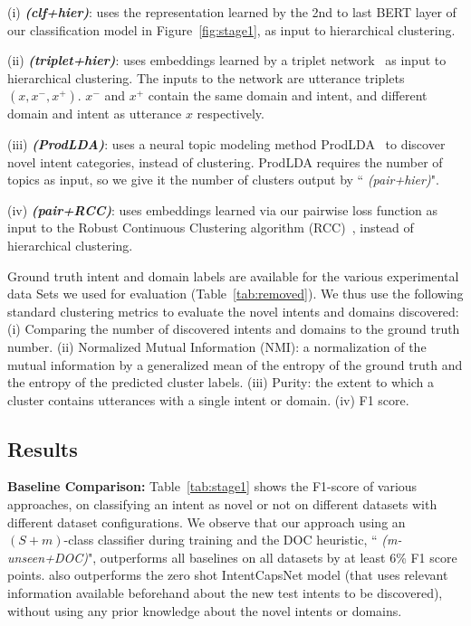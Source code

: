 \smallskip

\noindent (i) \textbf{\mname{} \textit{(clf+hier)}}: uses the representation learned by the 2nd to last BERT layer of our classification model in Figure~\ref{fig:stage1}, as input to hierarchical clustering. 

\noindent (ii) \textbf{\mname{} \textit{(triplet+hier)}}: uses embeddings learned by a triplet network~\cite{schroff2015facenet} as input to hierarchical clustering. The inputs to the network are utterance triplets $(x, x^-, x^+)$. $x^-$ and $x^+$ contain the same domain and intent, and different domain and intent as utterance $x$ respectively. 

\noindent (iii)  \textbf{\mname{} \textit{(ProdLDA)}}: uses a neural topic modeling method ProdLDA~\cite{srivastava2017autoencoding} to discover novel intent categories, instead of clustering. %
ProdLDA requires the number of topics as input, so we give it the number of clusters output by ``\mname{} \textit{(pair+hier)}".

\noindent (iv) \textbf{\mname{} \textit{(pair+RCC)}}: uses embeddings learned via our pairwise loss function as input to the Robust Continuous Clustering algorithm (RCC)~\cite{shah2017robust}, instead of hierarchical clustering. 
\smallskip

Ground truth intent and domain labels are available for the various experimental data Sets we used for evaluation (Table~\ref{tab:removed}). We thus use the following standard clustering metrics to evaluate the novel intents and domains discovered: (i) Comparing the number of discovered intents and domains to the ground truth number. (ii) Normalized Mutual Information (NMI): a normalization of the mutual information by a generalized mean of the entropy of the ground truth and the entropy of the predicted cluster labels. %
(iii) Purity: the extent to which a cluster contains utterances with a single intent or domain. (iv) F1 score.

\subsection{Results}

\noindent \textbf{Baseline Comparison: } Table~\ref{tab:stage1} shows the F1-score of various approaches, on classifying an intent as novel or not on different datasets with different dataset configurations. We observe that our approach using an $(S+m)$-class classifier during training and the DOC heuristic, ``\mname{} \textit{(m-unseen+DOC)}", outperforms all baselines on all datasets by at least 6\% F1 score points. \mname{} also outperforms the zero shot IntentCapsNet model (that uses relevant information available beforehand about the new test intents to be discovered), without using any prior knowledge about the novel intents or domains.


